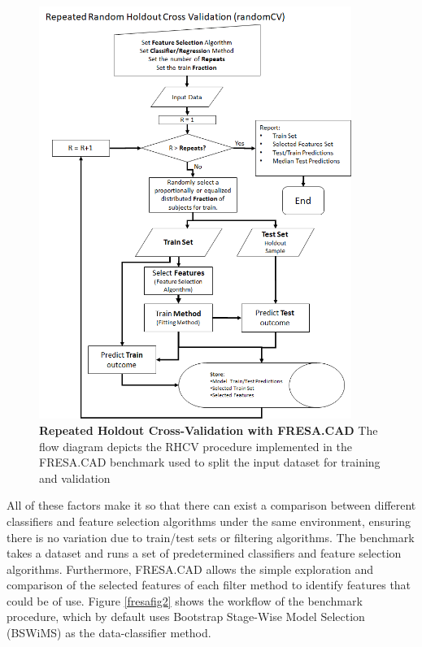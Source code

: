 \begin{figure}[!ht]
	\centerline{\includegraphics[width=4in]{images/background/fresaRCV.png}}
	\caption{{\bf Repeated Holdout Cross-Validation with FRESA.CAD\cite{fresa}}
		The flow diagram depicts the RHCV procedure implemented in the FRESA.CAD benchmark used to split the input dataset for training and validation} 
	\label{fresafig1}
\end{figure}


All of these factors make it so that there can exist a comparison between different classifiers and feature selection algorithms under the same environment, ensuring there is no variation due to train/test sets or filtering algorithms. The benchmark takes a dataset and runs a set of predetermined classifiers and feature selection algorithms. Furthermore, FRESA.CAD allows the simple exploration and comparison of the selected features of each filter method to identify features that could be of use. Figure \ref{fresafig2} shows the workflow of the benchmark procedure, which by default uses Bootstrap Stage-Wise Model Selection (BSWiMS) as the data-classifier method.

